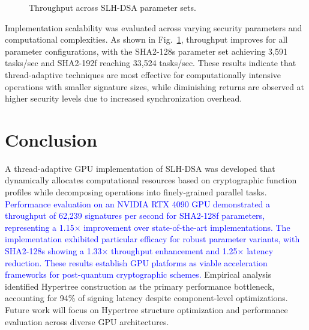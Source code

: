 \documentclass[journal]{IEEEtran}
\begin{document}
\begin{figure}[h]
  \centering
  \caption{Throughput across SLH-DSA parameter sets.}
  \label{fig:scalability_line}
\end{figure}

Implementation scalability was evaluated across varying security parameters and computational complexities. As shown in Fig.~\ref{fig:scalability_line}, throughput improves for all parameter configurations, with the SHA2-128s parameter set achieving 3,591 tasks/sec and SHA2-192f reaching 33,524 tasks/sec. These results indicate that thread-adaptive techniques are most effective for computationally intensive operations with smaller signature sizes, while diminishing returns are observed at higher security levels due to increased synchronization overhead.

\section{Conclusion}\label{sec:conclusion}

A thread-adaptive GPU implementation of SLH-DSA was developed that dynamically allocates computational resources based on cryptographic function profiles while decomposing operations into finely-grained parallel tasks. 
\textcolor{blue}{Performance evaluation on an NVIDIA RTX 4090 GPU demonstrated a throughput of 62,239 signatures per second for SHA2-128f parameters, representing a 1.15$\times$ improvement over state-of-the-art implementations. The implementation exhibited particular efficacy for robust parameter variants, with SHA2-128s showing a 1.33$\times$ throughput enhancement and 1.25$\times$ latency reduction. These results establish GPU platforms as viable acceleration frameworks for post-quantum cryptographic schemes.}
Empirical analysis identified Hypertree construction as the primary performance bottleneck, accounting for 94\% of signing latency despite component-level optimizations. Future work will focus on Hypertree structure optimization and performance evaluation across diverse GPU architectures.
\end{document}

